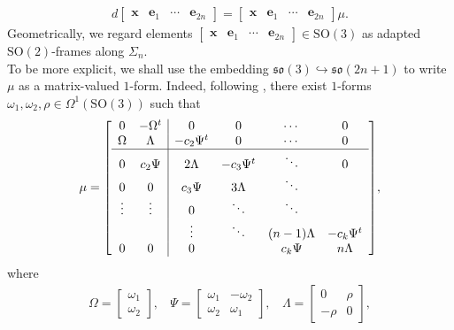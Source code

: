 \documentclass[11pt]{article}
\newcommand{\SO}{\mathrm{SO}}
\theoremstyle{definition}
\numberwithin{equation}{section}
\begin{document}
\begin{align} \label{eq:StrEq0}
d\!\begin{bmatrix} \mathbf{x} & \mathbf{e}_1 & \cdots & \mathbf{e}_{2n} \end{bmatrix} =  \begin{bmatrix} \mathbf{x} & \mathbf{e}_1 & \cdots & \mathbf{e}_{2n} \end{bmatrix} \mu.
\end{align}
Geometrically, we regard elements $\begin{bmatrix} \mathbf{x} & \mathbf{e}_1 & \cdots & \mathbf{e}_{2n} \end{bmatrix} \in \SO(3)$ as adapted $\SO(2)$-frames along $\Sigma_n$. \\
\indent To be more explicit, we shall use the embedding $\mathfrak{so}(3) \hookrightarrow \mathfrak{so}(2n+1)$ to write $\mu$ as a matrix-valued $1$-form.  Indeed, following \cite{Bryant85}, there exist $1$-forms $\omega_1, \omega_2, \rho \in \Omega^1(\SO(3))$ such that
\begin{equation} \label{eq:so3irrmc}
   \mu = \left[ \begin{array}{ c  c | c  c  c  c }
        0 & -\Omega^t & 0 & 0 & \cdots & 0 \\
        \Omega & \Lambda & - c_2 \Psi^t & 0 & \cdots & 0 \\ \hline
        0 & c_2 \Psi & 2 \Lambda & - c_3 \Psi^t & \ddots & 0 \\
        0 & 0 & c_3 \Psi & 3 \Lambda & \ddots & \\
        \vdots & \vdots & 0 & \ddots & \ddots & \\
         & & \vdots & \ddots &(n-1) \Lambda & -c_k \Psi^t \\
         0 & 0 & 0 & & c_k \Psi & n \Lambda
    \end{array}\right]\!,
\end{equation}
where
\begin{equation*}
    \begin{aligned}
        \Omega = \begin{bmatrix}
            \omega_1 \\
            \omega_2
        \end{bmatrix}, \:\:\:\: \Psi = \begin{bmatrix}
            \omega_1 & - \omega_2 \\
            \omega_2 & \omega_1
        \end{bmatrix}, \:\:\:\: \Lambda = \begin{bmatrix}
            0 & \rho \\
            -\rho & 0
        \end{bmatrix},
    \end{aligned}
\end{equation*}
\end{document}
